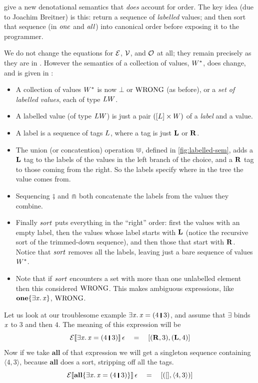  give a new denotational semantics that \emph{does} account for order.
The key idea (due to Joachim Breitner) is this: return a sequence of \emph{labelled} values;
and then sort that sequence (in $\mathit{one}$ and $\mathit{all}$) into canonical order
before exposing it to the programmer.

We do not change the equations for $\mathcal{E}$, $\mathcal{V}$, and $\mathcal{O}$ at all; they remain
precisely as they are in .
However the semantics of a collection of values, $W^{*}$, does change, and is given in :
\begin{itemize}
\item
A collection of values $W^{*}$ is now $\bot$ or $\mathrm{WRONG}$ (as before), or
a \emph{set of labelled values}, each of type $LW$.
\item A labelled value (of type $LW$)
is just a pair $([ L ] \times W)$ of a \emph{label} and a value.
\item A label is a sequence of tags $L$, where a tag is just ${\bf L}$ or ${\bf R}$.
\item The union (or concatention) operation $\Cup$, defined in \cref{fig:labelled-sem},
adds a ${\bf L}$ tag to the labels of the values in the left branch of the choice,
and a ${\bf R}$ tag to those coming from the right.
So the labels specify where in the tree the value comes from.
\item Sequencing $\fatsemi$ and $\Cap$ both concatenate the labels from the values they combine.
\item Finally $\mathit{sort}$ puts everything in the ``right'' order: first the values with
an empty label, then the values whose label starts with ${\bf L}$ (notice the
recursive sort of the trimmed-down sequence), and then those that start with ${\bf R}$.
Notice that $\mathit{sort}$ removes all the labels, leaving just a bare sequence of values $W^{*}$.
\item Note that if $\mathit{sort}$ encounters a set with more than one unlabelled element then this
considered $\mathrm{WRONG}$.  This makes ambiguous expressions, like \ensuremath{\textbf{one}\{\exists\Varid{x}.\,\Varid{x}\}}, $\mathrm{WRONG}$.
\end{itemize}
Let us look at our troublesome example \ensuremath{\exists\Varid{x}.\,\Varid{x}\mathrel{=}(\mathrm{4}\;\rule[-0.3mm]{0.5mm}{2.5mm}\;\mathrm{3})}, and assume that
\ensuremath{\exists} binds \ensuremath{\Varid{x}} to \ensuremath{\mathrm{3}} and then \ensuremath{\mathrm{4}}. The meaning of
this expression will be
$$
\semapp{E}{\ensuremath{\exists\Varid{x}.\,\Varid{x}\mathrel{=}(\mathrm{4}\;\rule[-0.3mm]{0.5mm}{2.5mm}\;\mathrm{3})}}{\epsilon} \quad = \quad [ (\lblright,3), (\lblleft,4) ]
$$
Now if we take \ensuremath{\textbf{all}} of that expression we will get a singleton sequence
containing \ensuremath{\langle{}\mathrm{4},\mathrm{3}\rangle}, because \ensuremath{\textbf{all}} does a sort, stripping off all the tags.
$$
\semapp{E}{\ensuremath{\textbf{all}\{\exists\Varid{x}.\,\Varid{x}\mathrel{=}(\mathrm{4}\;\rule[-0.3mm]{0.5mm}{2.5mm}\;\mathrm{3})\}}}{\epsilon} \quad = \quad [ ([], \ensuremath{\langle{}\mathrm{4},\mathrm{3}\rangle}) ]
$$


